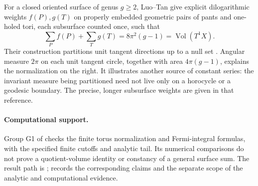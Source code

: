 For a closed oriented surface of genus $g\ge2$, Luo--Tan give explicit
dilogarithmic weights $f(P),g(T)$ on properly embedded geometric pairs of
pants and one-holed tori, each subsurface counted once,
such that
\begin{equation}
 \sum_P f(P)+\sum_T g(T)=8\pi^2(g-1)=\operatorname{Vol}(T^1X).
 \label{eq:luotan}
\end{equation}
Their construction partitions unit tangent directions up to a null set
\cite[Theorem 1.1 and Section 1.2]{LuoTan}. Angular measure $2\pi$ on
each unit tangent circle, together with area $4\pi(g-1)$, explains the
normalization on the right.
It illustrates another source of constant series: the invariant measure
being partitioned need not live only on a horocycle or a geodesic boundary.
The precise, longer subsurface weights are given in that reference.

\paragraph{Computational support.}
Group G1 of  checks
the finite torus normalization and Fermi-integral formulas, with the
specified finite cutoffs and analytic tail. Its numerical comparisons
do not prove a quotient-volume identity or constancy of a general
surface sum. The result path is
;
 records the corresponding claims
and the separate scope of the analytic and computational evidence.
